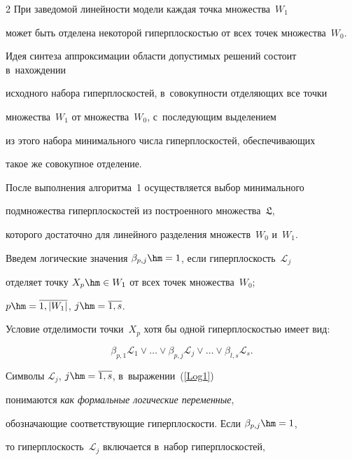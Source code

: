 \begin{multicols}{2}
При заведомой линейности модели каждая точка множества~$W_1$ 


может быть отделена некоторой  гиперплоскостью от всех точек множества~$W_0$. 


Идея синтеза аппроксимации области допустимых решений состоит в~нахождении  


исходного набора гиперплоскостей, в~совокупности отделяющих все точки 


 множества~$W_1$ от множества~$W_0$, с~по\-сле\-ду\-ющим выделением 


 из этого набора минимального числа гиперплоскостей, обеспечивающих 


 такое же совокупное отделение.


 





После выполнения алгоритма~1 осуществляется выбор минимального 


подмножества гиперплоскостей из построенного множества~$\mathfrak{L}$, 


которого достаточно для линейного разделения множеств~$W_0$  и~$W_1$.





Введем логические значения $\beta_{p,j}\hm=1$, если гиперплоскость~$\mathcal{L}_j$ 


отделяет точку $X_p\hm\in W_1$ от всех точек множества~$W_0$; 


 $p\hm=\overline{1,|W_1 |}$,  $j\hm=\overline{1,s}$. 


 Условие отделимости точки~$X_p$ хотя бы одной гипер\-плос\-костью имеет вид:


\begin{equation}


\label{Log1}


\beta_{p,1}\mathcal{L}_1\vee \dots \vee \beta_{p,j}\mathcal{L}_j\vee \dots \vee 


\beta_{l,s}\mathcal{ L}_s.


\end{equation}


Символы $\mathcal{L}_j$, $j\hm=\overline{1,s}$, в~выражении~(\ref{Log1}) 


понимаются \textit{как формальные логические переменные}, 


обозначающие соответствующие гиперплоскости. Если $\beta_{p,j}\hm=1$, 


то гиперплоскость~$\mathcal{L}_j$ включается в~набор гиперплоскостей, 



\end{multicols}
